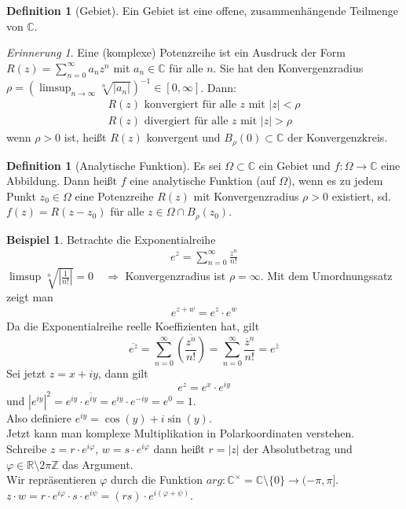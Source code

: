 \documentclass[11pt,titlepage]{article}
\theoremstyle{definition}
\newtheorem{definition}[theorem]{Definition}
\newtheorem{example}[theorem]{Beispiel}
\theoremstyle{remark}
\newtheorem*{remind}{Erinnerung}
\begin{document}
	\begin{definition}[Gebiet]
		Ein Gebiet ist eine offene, zusammenhängende Teilmenge von $\mathbb{C}$.
	\end{definition}
	
	\begin{remind}
		Eine (komplexe) Potenzreihe ist ein Ausdruck der Form $R(z)=\sum^{\infty}_{n=0} a_n z^n$ mit 
		$a_n \in \mathbb{C}$ für alle $n$. Sie hat den Konvergenzradius $\rho = \left( \limsup_{n\to\infty}
		\sqrt[n]{|a_n |}\right)^{-1} \in [0,\infty]$. Dann:
		\begin{eqnarray*}
			R(z)\text{ konvergiert für alle $z$ mit }|z|< \rho \\
			R(z)\text{ divergiert für alle $z$ mit }|z|> \rho 
		\end{eqnarray*}
		wenn $\rho>0$ ist, heißt $R(z)$ konvergent und $B_{\rho}(0)\subset \mathbb{C}$ der 
		Konvergenzkreis.
	\end{remind}
	
	\begin{definition}[Analytische Funktion]
		Es sei $\Omega\subset\mathbb{C}$ ein Gebiet und $f:\Omega\to\mathbb{C}$ eine Abbildung. 
		Dann heißt $f$ eine analytische Funktion (auf $\Omega$), wenn es zu jedem Punkt 
		$z_0 \in \Omega$ eine Potenzreihe $R(z)$ mit Konvergenzradius $\rho>0$ existiert, sd. 
		$f(z)=R(z-z_0 )$ für alle $z\in \Omega\cap B_{\rho}(z_0)$.
	\end{definition}
	
	\begin{example}
		Betrachte die Exponentialreihe
		\begin{eqnarray*}
			e^z = \sum_{n=0}^{\infty} \frac{z^n}{n!} 
		\end{eqnarray*}
		$\limsup \sqrt[n]{|\frac{1}{n!}|} =0 \quad \Rightarrow$ Konvergenzradius ist $\rho=\infty$.
		Mit dem Umordnungssatz zeigt man 
		\begin{eqnarray*}
			e^{z+w} =e^z \cdot e^w
		\end{eqnarray*}
		Da die Exponentialreihe reelle Koeffizienten hat, gilt
		\[ \overline{e^z} =\sum_{n=0}^{\infty} \overline{\left( \frac{z^n}{n!} \right)} = 
		\sum_{n=0}^{\infty} \frac{ \overline{z}^n}{n!} = e^{\overline{z}} \]
		Sei jetzt $z=x+iy$, dann gilt 
		\[e^z = e^x \cdot e^{iy} \]
		und $|e^{iy}|^2 = e^{iy} \cdot \overline{e^{iy}} = e^{iy} \cdot e^{-iy} = e^0 = 1$. \\
		Also definiere $e^{iy}=\cos(y)+i\sin (y)$.\\
		Jetzt kann man komplexe Multiplikation in Polarkoordinaten verstehen. \\
		Schreibe $z=r\cdot e^{i\varphi}$, $w=s\cdot e^{i\varphi}$ dann heißt $r=|z|$ der Absolutbetrag
		 und 
		$\varphi\in \mathbb{R}\setminus 2\pi \mathbb{Z}$ das Argument. \\
		Wir repräsentieren $\varphi$ durch die Funktion $arg:\mathbb{C}^{\times} =\mathbb{C}\setminus 
		\{ 0\} \to (-\pi ,\pi]$. \\
		$z\cdot w= r\cdot e^{i\varphi} \cdot s \cdot e^{i\psi} = (rs)\cdot e^{i(\varphi+\psi)}$.
	\end{example}
	
\end{document}
